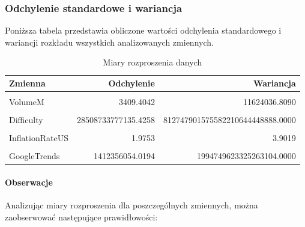 \documentclass[
  11pt,
]{article}
\begin{document}
\pagebreak

\subsubsection{Odchylenie standardowe i
wariancja}\label{odchylenie-standardowe-i-wariancja}

Poniższa tabela przedstawia obliczone wartości odchylenia standardowego
i wariancji rozkładu wszystkich analizowanych zmiennych.

\begin{table}[!h]
\centering
\caption{\label{tab:unnamed-chunk-3}Miary rozproszenia danych}
\centering
\begin{tabular}[t]{lrr}
\toprule
Zmienna & Odchylenie & Wariancja\\
\midrule
\cellcolor{gray!10}{Price} & \cellcolor{gray!10}{24372.5225} & \cellcolor{gray!10}{594019853.6838}\\
VolumeM & 3409.4042 & 11624036.8090\\
\cellcolor{gray!10}{USAvgKWHPrice} & \cellcolor{gray!10}{0.0155} & \cellcolor{gray!10}{0.0002}\\
Difficulty & 28508733777135.4258 & 812747901575582210644448888.0000\\
\cellcolor{gray!10}{BTCCirculation} & \cellcolor{gray!10}{4378359.6522} & \cellcolor{gray!10}{19170033244180.3398}\\
\addlinespace
InflationRateUS & 1.9753 & 3.9019\\
\cellcolor{gray!10}{HasMuskMentioned} & \cellcolor{gray!10}{0.5771} & \cellcolor{gray!10}{0.3330}\\
GoogleTrends & 1412356054.0194 & 1994749623325263104.0000\\
\bottomrule
\end{tabular}
\end{table}

\paragraph{\texorpdfstring{Obserwacje
\newline}{Obserwacje }}\label{obserwacje-1}

Analizując miary rozproszenia dla poszczególnych zmiennych, można
zaobserwować następujące prawidłowości:
\end{document}

